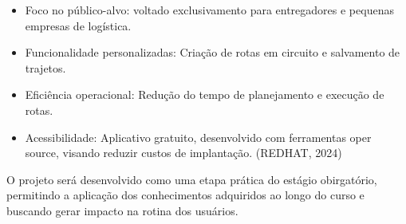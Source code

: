 \begin{itemize}
    \item Foco no público-alvo: voltado exclusivamento para entregadores e pequenas empresas de logística.
    \item Funcionalidade personalizadas: Criação de rotas em circuito e salvamento de trajetos.
    \item Eficiência operacional: Redução do tempo de planejamento e execução de rotas.
    \item Acessibilidade: Aplicativo gratuito, desenvolvido com ferramentas oper source, visando reduzir custos de implantação. (REDHAT, 2024)
\end{itemize}

O projeto será desenvolvido como uma etapa prática do estágio obirgatório, permitindo a aplicação dos conhecimentos adquiridos ao longo do curso e buscando gerar impacto na rotina dos usuários.
